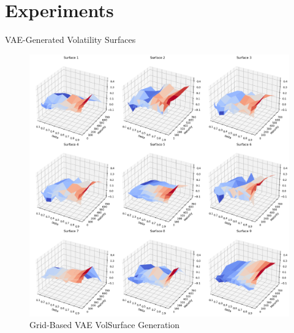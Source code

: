 \documentclass{beamer}
\begin{document}

\section{Experiments}

\begin{frame}{VAE-Generated Volatility Surfaces}
\begin{figure}
    \centering
    \includegraphics[width=0.6\linewidth]{docs/slides/img/vae_grid_beta0.01.png}
    \caption{Grid-Based VAE VolSurface Generation}
    \label{fig:enter-label}
\end{figure}
\end{frame}
\end{document}
